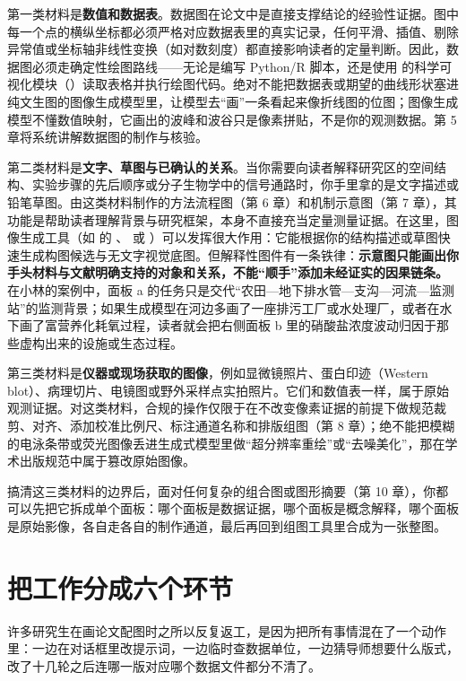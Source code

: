 第一类材料是\textbf{数值和数据表}。数据图在论文中是直接支撑结论的经验性证据。图中每一个点的横纵坐标都必须严格对应数据表里的真实记录，任何平滑、插值、剔除异常值或坐标轴非线性变换（如对数刻度）都直接影响读者的定量判断。因此，数据图必须走确定性绘图路线——无论是编写 Python/R 脚本，还是使用 \scidraw{} 的科学可视化模块（）读取表格并执行绘图代码。绝对不能把数据表或期望的曲线形状塞进纯文生图的图像生成模型里，让模型去“画”一条看起来像折线图的位图；图像生成模型不懂数值映射，它画出的波峰和波谷只是像素拼贴，不是你的观测数据。第 5 章将系统讲解数据图的制作与核验。

第二类材料是\textbf{文字、草图与已确认的关系}。当你需要向读者解释研究区的空间结构、实验步骤的先后顺序或分子生物学中的信号通路时，你手里拿的是文字描述或铅笔草图。由这类材料制作的方法流程图（第 6 章）和机制示意图（第 7 章），其功能是帮助读者理解背景与研究框架，本身不直接充当定量测量证据。在这里，图像生成工具（如 \scidraw{} 的 、 或 ）可以发挥很大作用：它能根据你的结构描述或草图快速生成构图候选与无文字视觉底图。但解释性图件有一条铁律：\textbf{示意图只能画出你手头材料与文献明确支持的对象和关系，不能“顺手”添加未经证实的因果链条。}在小林的案例中，面板 a 的任务只是交代“农田—地下排水管—支沟—河流—监测站”的监测背景；如果生成模型在河边多画了一座排污工厂或水处理厂，或者在水下画了富营养化耗氧过程，读者就会把右侧面板 b 里的硝酸盐浓度波动归因于那些虚构出来的设施或生态过程。

第三类材料是\textbf{仪器或现场获取的图像}，例如显微镜照片、蛋白印迹（Western blot）、病理切片、电镜图或野外采样点实拍照片。它们和数值表一样，属于原始观测证据。对这类材料，合规的操作仅限于在不改变像素证据的前提下做规范裁剪、对齐、添加校准比例尺、标注通道名称和排版组图（第 8 章）；绝不能把模糊的电泳条带或荧光图像丢进生成式模型里做“超分辨率重绘”或“去噪美化”，那在学术出版规范中属于篡改原始图像。

搞清这三类材料的边界后，面对任何复杂的组合图或图形摘要（第 10 章），你都可以先把它拆成单个面板：哪个面板是数据证据，哪个面板是概念解释，哪个面板是原始影像，各自走各自的制作通道，最后再回到组图工具里合成为一张整图。

\section{把工作分成六个环节}

许多研究生在画论文配图时之所以反复返工，是因为把所有事情混在了一个动作里：一边在对话框里改提示词，一边临时查数据单位，一边猜导师想要什么版式，改了十几轮之后连哪一版对应哪个数据文件都分不清了。

